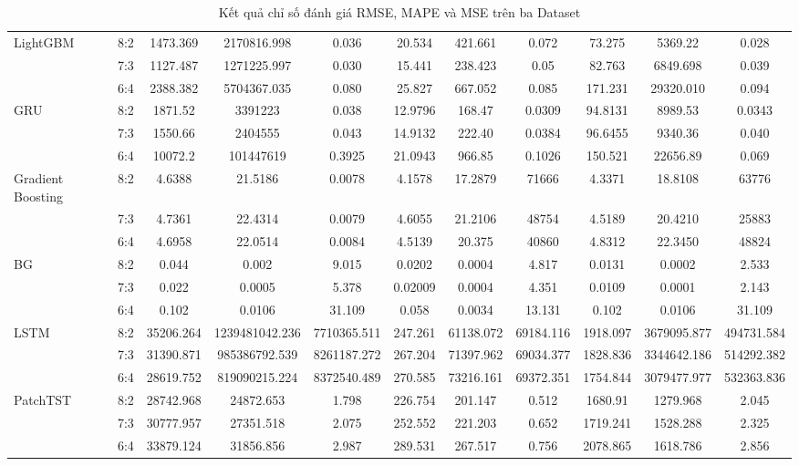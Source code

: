\documentclass[conference]{IEEEtran}
\begin{document}
\begin{table}[H]
\begin{tabular}{|l|c||c||c||c||c||c||c||c||c||c|}
\hline
LightGBM & 8:2 & 1473.369 & 2170816.998 & 0.036 & 20.534 & 421.661 & 0.072 & 73.275 & 5369.22 & 0.028  \\
    & 7:3 & 1127.487 & 1271225.997 & 0.030 & 15.441 & 238.423 & 0.05 & 82.763 & 6849.698 & 0.039  \\
    & 6:4 & 2388.382 & 5704367.035 & 0.080 & 25.827 & 667.052 & 0.085 & 171.231 & 29320.010 & 0.094  \\
\hline
GRU & 8:2 &1871.52  &3391223  &0.038 &12.9796 &168.47 &0.0309 &94.8131 &8989.53 &0.0343 \\
    & 7:3 &1550.66  &2404555  &0.043 &14.9132 &222.40 &0.0384 &96.6455 &9340.36 &0.040 \\
    & 6:4 &10072.2  &101447619  &0.3925 &21.0943 &966.85 &0.1026 &150.521 &22656.89 &0.069 \\
\hline
Gradient Boosting & 8:2 &4.6388  &21.5186  &0.0078 &4.1578 &17.2879 &71666 &4.3371 &18.8108 &63776 \\
    & 7:3 &4.7361  &22.4314  &0.0079 &4.6055 &21.2106 &48754 &4.5189 &20.4210 &25883 \\
     & 6:4 &4.6958  &22.0514  &0.0084 &4.5139 &20.375 &40860 &4.8312 &22.3450 &48824 \\
\hline
BG & 8:2 & 0.044 & 0.002 & 9.015 & 0.0202 & 0.0004 & 4.817 &  0.0131 & 0.0002& 2.533\\
    & 7:3 &  0.022 & 0.0005 & 5.378 &  0.02009 & 0.0004 & 4.351 & 0.0109 & 0.0001 & 2.143 \\
    & 6:4 & 0.102 & 0.0106 & 31.109 & 0.058 & 0.0034 & 13.131 & 0.102 & 0.0106 & 31.109 \\
\hline
LSTM & 8:2 & 35206.264 & 1239481042.236 & 7710365.511 & 247.261 & 61138.072 & 69184.116 & 1918.097 & 3679095.877 & 494731.584    \\
    & 7:3 & 31390.871 & 985386792.539 & 8261187.272 & 267.204 & 71397.962 & 69034.377 & 1828.836 & 3344642.186 & 514292.382   \\
    & 6:4 & 28619.752 & 819090215.224 & 8372540.489 & 270.585 & 73216.161 & 69372.351 & 1754.844 & 3079477.977 & 532363.836   \\
\hline
PatchTST & 8:2 & 28742.968 & 24872.653 & 1.798 & 226.754 & 201.147 & 0.512 & 1680.91 & 1279.968 & 2.045 \\
    & 7:3 & 30777.957 & 27351.518 & 2.075 & 252.552 & 221.203 & 0.652 & 1719.241 & 1528.288 & 2.325 \\
    & 6:4 & 33879.124 & 31856.856 & 2.987 & 289.531 & 267.517 & 0.756 & 2078.865 & 1618.786 & 2.856 \\
\hline
\end{tabular}
\caption{Kết quả chỉ số đánh giá RMSE, MAPE và MSE trên ba Dataset}
\end{table}    
\end{document}
